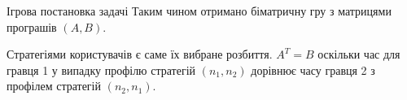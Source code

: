 \begin{frame}{Ігрова постановка задачі}
\manimate
	Таким чином отримано біматричну гру з матрицями програшів $(A,B)$.
	
	Стратегіями користувачів є саме їх вибране розбиття. $A^T = B$ оскільки час для гравця 1 у випадку профілю стратегій $(n_1, n_2)$ дорівнює часу гравця 2 з профілем стратегій $(n_2, n_1)$.
	
\end{frame}